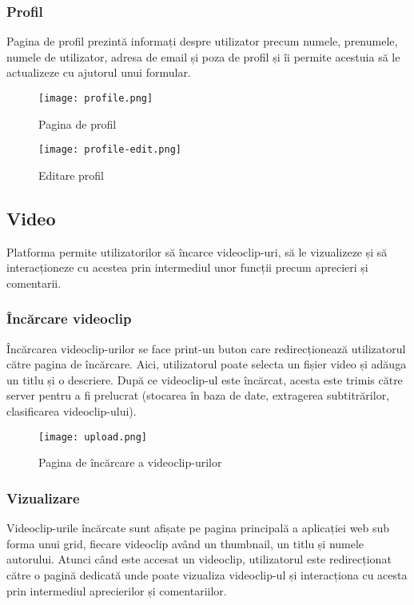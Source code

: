 \subsubsection{Profil}
Pagina de profil prezintă informați despre utilizator precum numele, prenumele, numele de utilizator,
adresa de email și poza de profil și îi permite acestuia să le actualizeze cu ajutorul unui formular.

\begin{figure}[h!]
    \centering
    \begin{minipage}{0.49\textwidth}
        \centering
        \texttt{[image: profile.png]}
        \caption{Pagina de profil}
        \label{fig:profile}
    \end{minipage}\hfill
    \begin{minipage}{0.49\textwidth}
        \centering
        \texttt{[image: profile-edit.png]}
        \caption{Editare profil}
        \label{fig:profile-edit}
    \end{minipage}
\end{figure}

\vspace{1em}

\subsection{Video}
Platforma permite utilizatorilor să încarce videoclip-uri, să le vizualizeze și să
interacționeze cu acestea prin intermediul unor funcții precum aprecieri și comentarii.
\subsubsection{Încărcare videoclip}
Încărcarea videoclip-urilor se face print-un buton care redirecționează utilizatorul către
pagina de încărcare. Aici, utilizatorul poate selecta un fișier video și adăuga un titlu și
o descriere. După ce videoclip-ul este încărcat, acesta este trimis către server pentru a fi
prelucrat (stocarea în baza de date, extragerea subtitrărilor, clasificarea videoclip-ului).

\begin{figure}[h]
    \centering
    \texttt{[image: upload.png]}
    \caption{Pagina de încărcare a videoclip-urilor}
    \label{fig:upload}
\end{figure}

\subsubsection{Vizualizare}
Videoclip-urile încărcate sunt afișate pe pagina principală a aplicației web sub forma unui
grid, fiecare videoclip având un thumbnail, un titlu și numele autorului. Atunci când este 
accesat un videoclip, utilizatorul este redirecționat către o pagină dedicată unde poate
vizualiza videoclip-ul și interacționa cu acesta prin intermediul aprecierilor și comentariilor.


